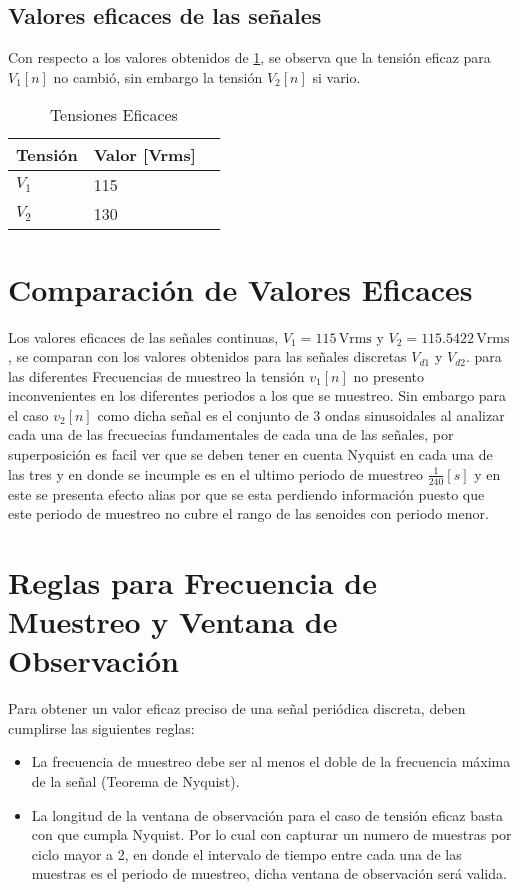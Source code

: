 \documentclass[conference]{IEEEtran}
\theoremstyle{mytheoremstyle}
\theoremstyle{mytheoremstyle}
\theoremstyle{myproblemstyle}
\begin{document}
            \subsection{Valores eficaces de las señales}
            Con respecto a los valores obtenidos de \ref{tab:tensiones2}, se observa que la tensión eficaz para $V_1[n]$ no cambió, sin embargo la tensión $V_2[n]$ si vario.   
            \begin{table}[h]
            \centering
            \caption{Tensiones Eficaces}
            \begin{tabular}{@{}lll@{}}
                \toprule
                Tensión & Valor [Vrms] \\ \midrule
                $V_1$   & 115     \\
                $V_2$   & 130     \\ \bottomrule
            \end{tabular}
            \label{tab:tensiones2}
            \end{table}
        
                        
            \section*{Comparación de Valores Eficaces}
            Los valores eficaces de las señales continuas, \( V_1 = 115 \, \text{Vrms} \) y \( V_2 = 115.5422 \, \text{Vrms} \), se comparan con los valores obtenidos para las señales discretas \( V_{d1} \) y \( V_{d2} \). para las diferentes Frecuencias de muestreo la tensión $v_1[n]$ no presento inconvenientes en los diferentes periodos a los que se muestreo. Sin embargo para el caso $v_2[n]$ como dicha señal es el conjunto de 3 ondas sinusoidales al analizar cada una de las frecuecias fundamentales de cada una de las señales, por superposición es facil ver que se deben tener en cuenta Nyquist en cada una de las tres y en donde se incumple es en el ultimo periodo de muestreo $\frac{1}{240} [s]$ y en este se presenta efecto alias por que se esta perdiendo información puesto que este periodo de muestreo no cubre el rango de las senoides con periodo menor.

            \section*{Reglas para Frecuencia de Muestreo y Ventana de Observación}
            Para obtener un valor eficaz preciso de una señal periódica discreta, deben cumplirse las siguientes reglas:
            \begin{itemize}
                \item La frecuencia de muestreo debe ser al menos el doble de la frecuencia máxima de la señal (Teorema de Nyquist).
                \item La longitud de la ventana de observación para el caso de tensión eficaz basta con que cumpla Nyquist. Por lo cual con capturar un numero de muestras por ciclo mayor a 2, en donde el intervalo de tiempo entre cada una de las muestras es el periodo de muestreo, dicha ventana de observación será valida.
            \end{itemize}
\end{document}
